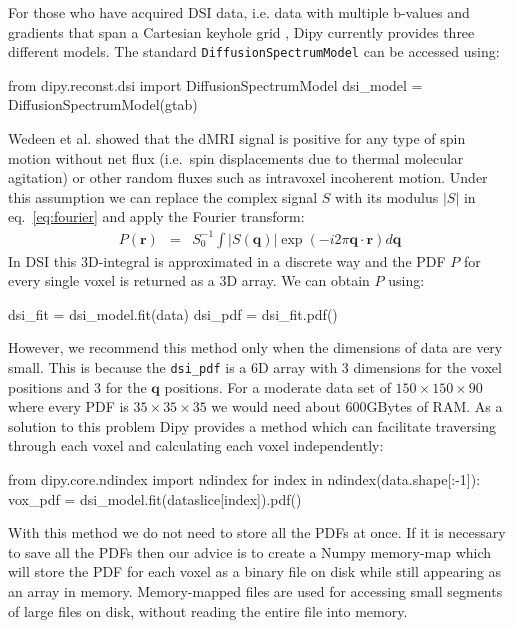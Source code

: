 \documentclass{bioinfo}
\begin{document}
For those who have acquired DSI data, i.e. data with multiple b-values
and gradients that span a Cartesian keyhole grid \citep{tuch:02,
  wedeen-hagmann-etal:05, Garyfallidis_thesis}, Dipy currently provides three
different models. The standard \texttt{DiffusionSpectrumModel} can be
accessed using:
\begin{python}
from dipy.reconst.dsi import DiffusionSpectrumModel
dsi_model = DiffusionSpectrumModel(gtab)
\end{python}
Wedeen et al. \citep{wedeen-hagmann-etal:05} showed that the dMRI
signal is positive for any type of spin motion without net flux (i.e.~spin
displacements due to thermal molecular agitation) or other random fluxes such
as intravoxel incoherent motion. Under this assumption we can replace the
complex signal $S$ with its modulus $|S|$ in eq.~\ref{eq:fourier} and apply the
Fourier transform:
\begin{eqnarray}
P(\mathbf{r}) & = &
S_{0}^{-1}\int|S(\mathbf{q})|\exp(-i2\pi\mathbf{q}\cdot\mathbf{r})d\mathbf{q}\label{eq:P_modulus}
\end{eqnarray}
In DSI this 3D-integral is approximated in a discrete way and the
PDF $P$ for every single voxel is returned as a 3D array. We can obtain
$P$ using:
\begin{python}
dsi_fit = dsi_model.fit(data)
dsi_pdf = dsi_fit.pdf()
\end{python}
However, we recommend this method only when the dimensions of data are very
small. This is because the \texttt{dsi\_pdf} is a 6D array with 3 dimensions
for the voxel positions and 3 for the $\mathbf{q}$ positions. For a
moderate data set of $150\times150\times90$ where every PDF is
$35\times35\times35$ we would need about 600GBytes of RAM. As a solution to
this problem Dipy provides a method which can facilitate traversing through
each voxel and calculating each voxel independently:
\begin{python}
from dipy.core.ndindex import ndindex
for index in ndindex(data.shape[:-1]):
    vox_pdf = dsi_model.fit(dataslice[index]).pdf()
\end{python}
With this method we do not need to store all the PDFs at once. If it is
necessary to save all the PDFs then our advice is to create a Numpy memory-map
which will store the PDF for each voxel as a binary file on disk while still
appearing as an array in memory. Memory-mapped files are used for accessing
small segments of large files on disk, without reading the entire file into
memory.
\end{document}
